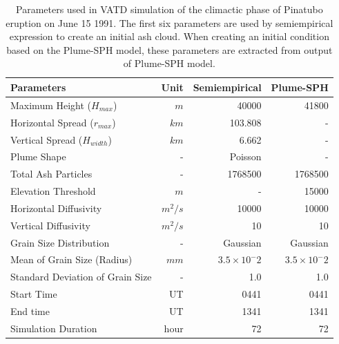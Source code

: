 \documentclass[utf8]{frontiersSCNS} %
\begin{document}
\begin{table}[htp]
\centering
\caption{Parameters used in VATD simulation of the climactic phase of Pinatubo eruption on June 15 1991. The first six parameters are used by semiempirical expression to create an initial ash cloud. When creating an initial condition based on the Plume-SPH model, these parameters are extracted from output of Plume-SPH model.}
	 \begin{tabular}{lrrr}
	 \hline
	 Parameters & Unit & Semiempirical & Plume-SPH \\
	 \hline
	 Maximum Height ($H_{max}$) & $m$ & 40000 & 41800 \\
	 Horizontal Spread ($r_{max}$) & $km$ & 103.808 & -\\
	 Vertical Spread ($H_{width}$) & $km$ & 6.662 & - \\
	 Plume Shape & - & Poisson & - \\
	 Total Ash Particles & - & 1768500 & 1768500 \\
	 Elevation Threshold & $m$ & - & 15000 \\
	 Horizontal Diffusivity & $m^2/s$ &10000 & 10000\\
	 Vertical Diffusivity & $m^2/s$ & 10 & 10 \\
	 Grain Size Distribution & - & Gaussian & Gaussian \\
	 Mean of Grain Size (Radius) & $mm$ & $3.5 \times 10 ^-2$ & $3.5 \times 10 ^-2$ \\
	 Standard Deviation of Grain Size & - & 1.0 & 1.0 \\
	 	Start Time & UT & 0441 & 0441 \\
	 End time & UT & 1341 & 1341 \\
	 Simulation Duration & hour & 72 & 72 \\
	 \hline
	 \end{tabular}
	 \label{tab:input_parameter_Puff_simulation}
\end{table}
\end{document}
